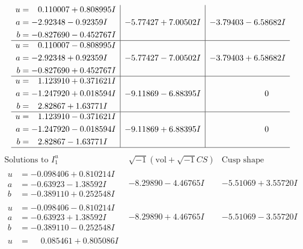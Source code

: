 \documentclass[1p]{elsarticle_modified}
\theoremstyle{definition}
\newcommand{\I}{\sqrt{-1}}
\begin{document}
$$\begin{array}{c|c|c}
\begin{aligned}
u &= \phantom{-}0.110007 + 0.808995 I \\
a &= -2.92348 - 0.92359 I \\
b &= -0.827690 - 0.452767 I\end{aligned}
 & -5.77427 + 7.00502 I & -3.79403 - 6.58682 I \\ \hline\begin{aligned}
u &= \phantom{-}0.110007 - 0.808995 I \\
a &= -2.92348 + 0.92359 I \\
b &= -0.827690 + 0.452767 I\end{aligned}
 & -5.77427 - 7.00502 I & -3.79403 + 6.58682 I \\ \hline\begin{aligned}
u &= \phantom{-}1.123910 + 0.371621 I \\
a &= -1.247920 + 0.018594 I \\
b &= \phantom{-}2.82867 + 1.63771 I\end{aligned}
 & -9.11869 - 6.88395 I & \phantom{-0.000000 } 0 \\ \hline\begin{aligned}
u &= \phantom{-}1.123910 - 0.371621 I \\
a &= -1.247920 - 0.018594 I \\
b &= \phantom{-}2.82867 - 1.63771 I\end{aligned}
 & -9.11869 + 6.88395 I & \phantom{-0.000000 } 0\\
 \hline 
 \end{array}$$\newpage$$\begin{array}{c|c|c}  
\text{Solutions to }I^u_{1}& \I (\text{vol} + \sqrt{-1}CS) & \text{Cusp shape}\\
 \hline 
\begin{aligned}
u &= -0.098406 + 0.810214 I \\
a &= -0.63923 - 1.38592 I \\
b &= -0.389110 + 0.252548 I\end{aligned}
 & -8.29890 - 4.46765 I & -5.51069 + 3.55720 I \\ \hline\begin{aligned}
u &= -0.098406 - 0.810214 I \\
a &= -0.63923 + 1.38592 I \\
b &= -0.389110 - 0.252548 I\end{aligned}
 & -8.29890 + 4.46765 I & -5.51069 - 3.55720 I \\ \hline\begin{aligned}
u &= \phantom{-}0.085461 + 0.805086 I \\

\end{aligned}
\end{array}$$
\end{document}
